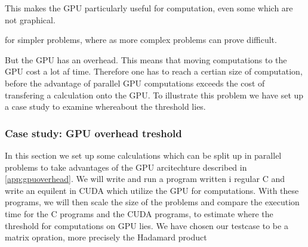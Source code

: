 This makes the GPU particularly useful for computation, even some which are not graphical. %


for simpler problems, where as more complex problems can prove difficult.  

But the GPU has an overhead.
This means that moving computations to the GPU cost a lot af time.
Therefore one has to reach a certian size of computation, before the advantage of parallel GPU computations exceeds the cost of transfering a calculation onto the GPU.
To illustrate this problem we have set up a case study to examine whereabout the threshold lies. 

\subsubsection{Case study: GPU overhead treshold}
In this section we set up some calculations which can be split up in parallel problems to take advantages of the GPU arcitechture described in \ref{app:gpuoverhead}.
We will write and run a program written i regular C and write an equilent in CUDA which utilize the GPU for computations.
With these programs, we will then scale the size of the problems and compare the execution time for the C programs and the CUDA programs, to estimate where the threshold for computations on GPU lies.
We have chosen our testcase to be a matrix opration, more precisely the  Hadamard product


